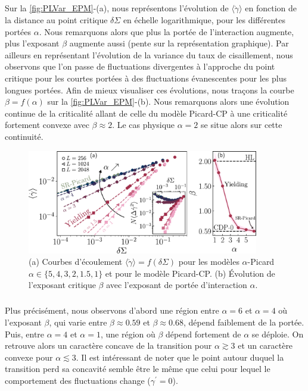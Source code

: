 \subparagraph{}Sur la \autoref{fig:PLVar_EPM}-(a), nous représentons l'évolution de $\langle \dot{\gamma} \rangle$ en fonction de la distance au point critique $\delta\Sigma$ en échelle logarithmique, pour les différentes portées $\alpha$. Nous remarquons alors que plus la portée de l'interaction augmente, plus l'exposant $\beta$ augmente aussi (pente sur la représentation graphique). Par ailleurs en représentant l'évolution de la variance du taux de cisaillement, nous observons que l'on passe de fluctuations divergentes à l'approche du point critique pour les courtes portées à des fluctuations évanescentes pour les plus longues portées. Afin de mieux visualiser ces évolutions, nous traçons la courbe $\beta = f(\alpha)$ sur la \autoref{fig:PLVar_EPM}-(b). Nous remarquons alors une évolution continue de la criticalité allant de celle du modèle Picard-CP à une criticalité fortement convexe avec $\beta\approx 2$. Le cas physique $\alpha=2$ se situe alors sur cette continuité.

\begin{figure}[h]
	\centering
	\includegraphics[width=0.9\textwidth]{Chapitre4/Figures/LonguePortee/AlphaPicard.pdf}
	\caption{(a) Courbes d'écoulement $\langle\dot{\gamma}\rangle = f(\delta\Sigma)$ pour les modèles $\alpha$-Picard $\alpha \in \{5, 4, 3, 2, 1.5, 1\}$ et pour le modèle Picard-CP.
(b) Évolution de l'exposant critique $\beta$ avec l'exposant de portée d'interaction $\alpha$.}
	\label{fig:PLVar_EPM}
\end{figure}

\subparagraph{}Plus précisément, nous observons d'abord une région entre $\alpha = 6$ et $\alpha = 4$ où l'exposant $\beta$, qui varie entre $\beta \approx 0.59$ et $\beta \approx 0.68$, dépend faiblement de la portée. Puis, entre $\alpha = 4$ et $\alpha=1$, une région où $\beta$ dépend fortement de $\alpha$ se déploie. On retrouve alors un caractère concave de la transition pour $\alpha \gtrsim 3$ et un caractère convexe pour $\alpha \lesssim 3$. Il est intéressant de noter que le point autour duquel la transition perd sa concavité semble être le même que celui pour lequel le comportement des fluctuations change ($\gamma^\prime = 0$). 

